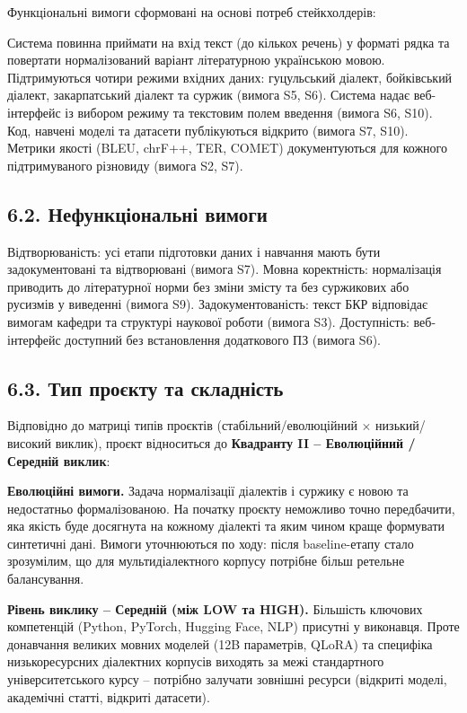 \documentclass[14pt]{extarticle}
\begin{document}
Функціональні вимоги сформовані на основі потреб стейкхолдерів:

Система повинна приймати на вхід текст (до кількох речень) у форматі рядка та повертати нормалізований варіант літературною українською мовою. Підтримуються чотири режими вхідних даних: гуцульський діалект, бойківський діалект, закарпатський діалект та суржик (вимога S5, S6). Система надає веб-інтерфейс із вибором режиму та текстовим полем введення (вимога S6, S10). Код, навчені моделі та датасети публікуються відкрито (вимога S7, S10). Метрики якості (BLEU, chrF++, TER, COMET) документуються для кожного підтримуваного різновиду (вимога S2, S7).

\subsection*{6.2. Нефункціональні вимоги}

Відтворюваність: усі етапи підготовки даних і навчання мають бути задокументовані та відтворювані (вимога S7). Мовна коректність: нормалізація приводить до літературної норми без зміни змісту та без суржикових або русизмів у виведенні (вимога S9). Задокументованість: текст БКР відповідає вимогам кафедри та структурі наукової роботи (вимога S3). Доступність: веб-інтерфейс доступний без встановлення додаткового ПЗ (вимога S6).

\subsection*{6.3. Тип проєкту та складність}

Відповідно до матриці типів проєктів (стабільний/еволюційний $\times$ низький/високий виклик), проєкт відноситься до \textbf{Квадранту II -- Еволюційний / Середній виклик}:

\textbf{Еволюційні вимоги.} Задача нормалізації діалектів і суржику є новою та недостатньо формалізованою. На початку проєкту неможливо точно передбачити, яка якість буде досягнута на кожному діалекті та яким чином краще формувати синтетичні дані. Вимоги уточнюються по ходу: після baseline-етапу стало зрозумілим, що для мультидіалектного корпусу потрібне більш ретельне балансування.

\textbf{Рівень виклику -- Середній (між LOW та HIGH).} Більшість ключових компетенцій (Python, PyTorch, Hugging Face, NLP) присутні у виконавця. Проте донавчання великих мовних моделей (12B параметрів, QLoRA) та специфіка низькоресурсних діалектних корпусів виходять за межі стандартного університетського курсу -- потрібно залучати зовнішні ресурси (відкриті моделі, академічні статті, відкриті датасети).
\end{document}
